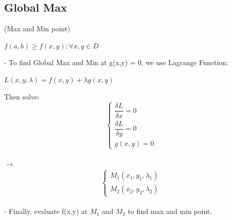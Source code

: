 \documentclass[12pt]{article}
\begin{document}
\subsection{Global Max} (Max and Min point)
\begin{mybox}
	\begin{center}
		$f(a,b) \ge f(x,y); \forall x,y \in D$
	\end{center}
\end{mybox}
- To find Global Max and Min at g(x,y) = 0, we use Lagrange Function: \\
\begin{mybox}
	\begin{center}
		$L(x,y, \lambda) = f(x,y) + \lambda g(x,y)$
	\end{center}
\end{mybox}
Then solve:
$$
\begin{cases}
	\dfrac{\delta L}{\delta x} = 0 \\ 
	\dfrac{\delta L}{\delta y} = 0 \\
	g(x,y) = 0
\end{cases}
$$
\\
$\rightarrow$ 
$$
\begin{cases}
	M_1 (x_1,y_1, \lambda _1) \\
	M_2 (x_2, y_2, \lambda _2)
\end{cases}
$$
\\ 
- Finally, evaluate f(x,y) at $M_1$ and $M_2$ to find max and min point.
\end{document}
